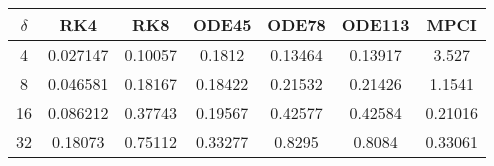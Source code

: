 \begin{tabular}{ccccccc}
\hline
$\delta$ & RK4 & RK8 & ODE45 & ODE78 & ODE113 &MPCI\\ 
\hline 
4 & 0.027147 & 0.10057 & 0.1812 & 0.13464 & 0.13917 & 3.527\\ 
8 & 0.046581 & 0.18167 & 0.18422 & 0.21532 & 0.21426 & 1.1541\\ 
16 & 0.086212 & 0.37743 & 0.19567 & 0.42577 & 0.42584 & 0.21016\\ 
32 & 0.18073 & 0.75112 & 0.33277 & 0.8295 & 0.8084 & 0.33061\\ 
\hline 
\end{tabular}